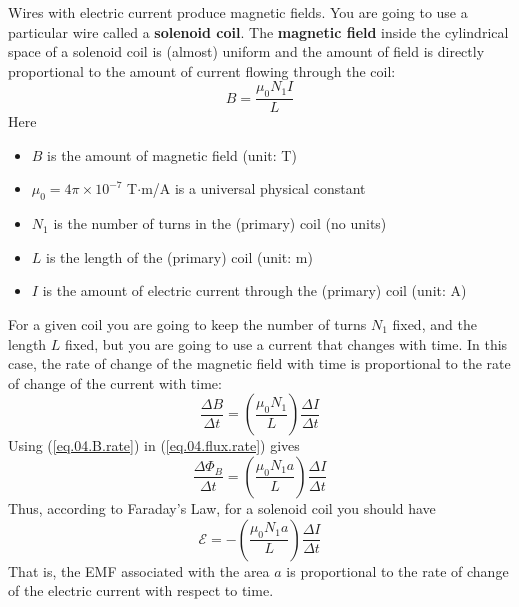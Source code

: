 Wires with electric current produce magnetic fields. You are going to use a particular wire called a \textbf{solenoid coil}. The \textbf{magnetic field} inside the cylindrical space of a solenoid coil is (almost) uniform and the amount of field is directly proportional to the amount of current flowing through the coil:
\begin{equation}
	B = \frac{\mu_{0} N_{1} I}{L}
	\label{eq.04.B.coil}
\end{equation}
Here
\begin{itemize}
	\item $B$ is the amount of magnetic field (unit: T)
	\item $\mu_{0} = 4 \pi \times 10^{-7}$ T$\cdot$m/A  is a universal physical constant
	\item $N_{1}$ is the number of turns in the (primary) coil (no units)
	\item $L$ is the length of the (primary) coil (unit: m)
	\item $I$ is the amount of electric current through the (primary) coil (unit: A)
\end{itemize}
For a given coil you are going to keep the number of turns $N_{1}$ fixed, and the length $L$ fixed, but you are going to use a current that changes with time. In this case, the rate of change of the magnetic field with time is proportional to the rate of change of the current with time:
\begin{equation}
	\frac{\Delta B}{\Delta t} = \left( \frac{\mu_{0} N_{1}}{L} \right) \frac{\Delta I}{\Delta t}
	\label{eq.04.B.rate}
\end{equation}
Using (\ref{eq.04.B.rate}) in (\ref{eq.04.flux.rate}) gives
\begin{equation}
	\frac{\Delta \Phi_{B}}{\Delta t} = \left( \frac{\mu_{0} N_{1} a}{L} \right) \frac{\Delta I}{\Delta t}
\end{equation}
Thus, according to Faraday's Law, for a solenoid coil you should have
\begin{equation}
	\mathcal{E} = -\left( \frac{\mu_{0} N_{1} a}{L} \right) \frac{\Delta I}{\Delta t}
	\label{eq.04.emf.solenoid}
\end{equation}
That is, the EMF associated with the area $a$ is proportional to the rate of change of the electric current with respect to time.
%
